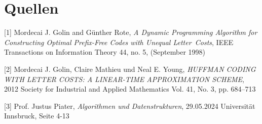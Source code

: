 \documentclass[a4paper,10pt,ngerman]{scrartcl}
\begin{document}
\section{Quellen}

[1]  Mordecai J. Golin and Günther Rote,  \textit{A Dynamic Programming Algorithm for Constructing Optimal Prefix-Free Codes with Unequal Letter Costs}, IEEE Transactions on Information Theory 44, no. 5, (September 1998)

[2] Mordecai J. Golin, Claire Mathieu und Neal E. Young, \textit{HUFFMAN CODING WITH LETTER COSTS: A LINEAR-TIME APPROXIMATION SCHEME}, 2012 Society for Industrial and Applied Mathematics
Vol. 41, No. 3, pp. 684–713

[3] Prof. Justus Piater, \textit{Algorithmen und Datenstrukturen}, 29.05.2024 Universität Innsbruck, Seite 4-13
\end{document}

